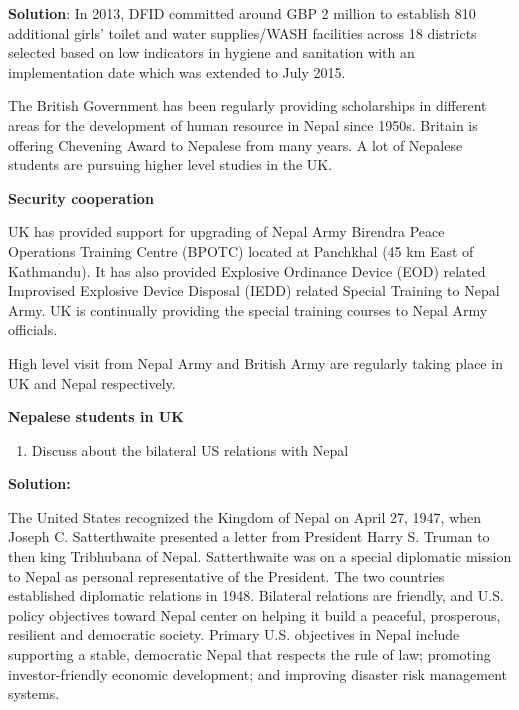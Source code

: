 \documentclass[
  openany]{book}
\providecommand{\tightlist}{%
  \setlength{\itemsep}{0pt}\setlength{\parskip}{0pt}}
\newenvironment{solution}{ {\bfseries Solution}:}{}
\begin{document}
\begin{questions}
\begin{solution}
In 2013, DFID committed around GBP 2 million to establish 810 additional girls' toilet and water supplies/WASH facilities across 18 districts selected based on low indicators in hygiene and sanitation with an implementation date which was extended to July 2015.

The British Government has been regularly providing scholarships in different areas for the development of human resource in Nepal since 1950s. Britain is offering Chevening Award to Nepalese from many years. A lot of Nepalese students are pursuing higher level studies in the UK. 

\textbf{Security cooperation}

UK has provided support for upgrading of Nepal Army Birendra Peace Operations Training Centre (BPOTC) located at Panchkhal (45 km East of Kathmandu). It has also provided Explosive Ordinance Device (EOD) related Improvised Explosive Device Disposal (IEDD) related Special Training to Nepal Army. UK is continually providing the special training courses to Nepal Army officials.

High level visit from Nepal Army and British Army are regularly taking place in UK and Nepal respectively.

\textbf{Nepalese students in UK}

\end{solution}

\end{questions}

\begin{enumerate}
\def\labelenumi{\arabic{enumi}.}
\setcounter{enumi}{1}
\tightlist
\item
  Discuss about the bilateral US relations with Nepal
\end{enumerate}

\textbf{Solution:}

The United States recognized the Kingdom of Nepal on April 27, 1947, when Joseph C. Satterthwaite presented a letter from President Harry S. Truman to then king Tribhubana of Nepal. Satterthwaite was on a special diplomatic mission to Nepal as personal representative of the President. The two countries established diplomatic relations in 1948. Bilateral relations are friendly, and U.S. policy objectives toward Nepal center on helping it build a peaceful, prosperous, resilient and democratic society. Primary U.S. objectives in Nepal include supporting a stable, democratic Nepal that respects the rule of law; promoting investor-friendly economic development; and improving disaster risk management systems.
\end{document}
